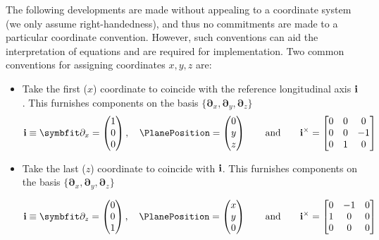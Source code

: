 \iffalse
\begin{remark}
The following developments are made without appealing to a coordinate system (we only assume right-handedness), and thus no commitments are made to a particular coordinate convention. However, such conventions can aid the interpretation of equations and are required for implementation. 
Two common conventions for assigning coordinates \(x,y,z\) are:
\begin{itemize}
    \item Take the first (\(x\)) coordinate to coincide with the reference longitudinal axis \(\mathbf{i}\). This furnishes components on the basis \(\{\bm{\partial}_x,\bm{\partial}_y,\bm{\partial}_z\}\)
    \[
    \FrameBasis \equiv \bm{\partial}_x = \begin{pmatrix}
        1 \\ 0 \\ 0
    \end{pmatrix},
    \quad
    \PlanePosition = \begin{pmatrix}
    0 \\ y \\ z
    \end{pmatrix}
    \qquad\text{and}\qquad 
    \FrameBasis^{\times} = \begin{bmatrix}
        0 & 0 & 0 \\
        0 & 0 & -1 \\
        0 & 1 & 0
    \end{bmatrix}
    \]
    \item Take the last (\(z\)) coordinate to coincide with \(\mathbf{i}\). This furnishes components on the basis \(\{\bm{\partial}_x,\bm{\partial}_y,\bm{\partial}_z\}\)
    
    \[
    \FrameBasis \equiv \bm{\partial}_z = \begin{pmatrix}
        0 \\ 0 \\ 1
    \end{pmatrix},
    \quad
    \PlanePosition = \begin{pmatrix}
    x \\ y \\ 0
    \end{pmatrix}
    \qquad\text{and}\qquad 
    \FrameBasis^{\times} = \begin{bmatrix}
        0 & -1 & 0 \\
        1 &  0 & 0 \\
        0 & 0 & 0
    \end{bmatrix}
    \]
\end{itemize}
\end{remark}

